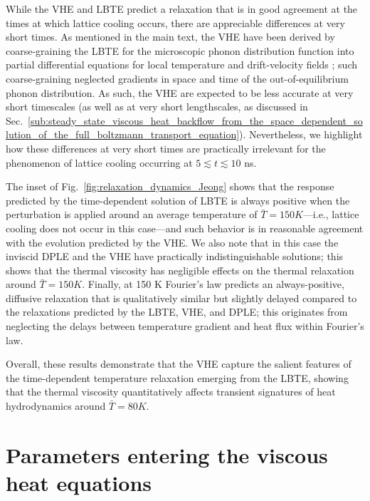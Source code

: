 \documentclass[
prb,
twocolumn,
superscriptaddress,
 amsmath,amssymb,
 aps,
longbibliography,
]{revtex4-2}
\begin{document}
While the VHE and LBTE predict a relaxation that is in good agreement at the times at which lattice cooling occurs, there are appreciable differences at very short times. As mentioned in the main text, the VHE have been derived \cite{Simoncelli2020} by coarse-graining the LBTE for the microscopic phonon distribution function into
partial differential equations for local temperature and drift-velocity fields \cite{Simoncelli2020}; such coarse-graining neglected gradients in space and time of the out-of-equilibrium phonon distribution. As such, the VHE are expected to be less accurate at very short timescales (as well as at very short lengthscales, as discussed in Sec.~\ref{sub:steady_state_viscous_heat_backflow_from_the_space_dependent_solution_of_the_full_boltzmann_transport_equation}).
Nevertheless, we highlight how these differences at very short times are practically irrelevant for the phenomenon of lattice cooling occurring at $5\lesssim t \lesssim 10$ ns.

The inset of Fig.~\ref{fig:relaxation_dynamics_Jeong} shows that the response predicted by the time-dependent solution of LBTE is always positive when the perturbation is applied around an average temperature of $\bar{T}=150 K$---i.e., lattice cooling does not occur in this case---and such behavior is in reasonable agreement with the evolution predicted by the VHE.
We also note that in this case the inviscid DPLE and the VHE have practically indistinguishable solutions; this shows that the thermal viscosity has negligible effects on the thermal relaxation around $\bar{T}=150 K$. Finally, at 150 K Fourier's law predicts an always-positive, diffusive relaxation that is qualitatively similar but slightly delayed compared to the relaxations predicted by the LBTE, VHE, and DPLE; this originates from neglecting the delays between temperature gradient and heat flux within Fourier's law.

Overall, these results demonstrate that the VHE capture the salient features of the time-dependent temperature relaxation emerging from the LBTE, showing that the thermal viscosity quantitatively affects transient signatures of heat hydrodynamics around $\bar{T}=80 K$.




\section{Parameters entering the viscous heat equations}
\label{sec:parameters_entering_in_the_viscous_heat_equations}
\end{document}
